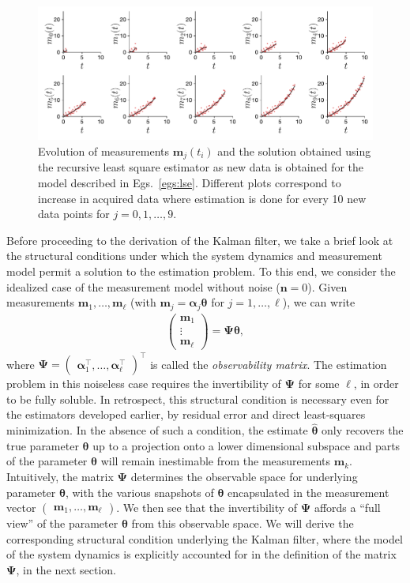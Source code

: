 \documentclass{resonance}
\def\th{\bm{\theta}}
\def\thh{\bm{\hat{\theta}}}
\def\n{\bm{n}}
\def\m{\bm{m}}
\def\H{\bm{\alpha}}
\begin{document}
\begin{figure}
    \centering
    \includegraphics[width=\textwidth]{./figs/rlse.pdf}
    \caption{Evolution of measurements $\m_j(t_i)$ and the solution obtained using the recursive least square estimator as new data is obtained for the model described in Egs.~\ref{egs:lse}. Different plots correspond to increase in acquired data where estimation is done for every 10 new data points for $j = 0, 1, \dots, 9$.}
    \label{fig:rlseFig}
\end{figure}

Before proceeding to the derivation of the Kalman filter,
we take a brief look at the structural conditions under which the system dynamics and measurement model permit a solution to the estimation problem. To this end, we consider the idealized case of the measurement model without noise ($\n = 0$). Given measurements $\m_1, \ldots, \m_\ell$ 
(with $\m_j = \H_j \th$ for $j=1, \ldots, \ell$), we can write
\begin{align*}
    \left( \begin{matrix} \m_1 \\ \vdots \\ \m_{\ell} \end{matrix} \right) 
    = \mathbf{\Psi}  \th,
\end{align*}
where $\mathbf{\Psi} = \left( \begin{matrix} \H_1^\top,  \ldots,  \H_{\ell}^\top \end{matrix} \right)^\top$
is called the \textit{observability matrix}.
The estimation problem in this noiseless case 
requires the invertibility of $\mathbf{\Psi}$
for some $\ell$, in order to be fully soluble. 
In retrospect, this structural condition is necessary even for the estimators developed earlier, by residual error and direct least-squares minimization. In the absence of such a 
condition, the estimate $\thh$ only recovers the true parameter $\th$ up to a projection onto a lower dimensional
subspace and parts of the parameter $\th$ will remain inestimable from the measurements $\m_k$. Intuitively, the matrix $\mathbf{\Psi}$ determines the observable space for underlying parameter $\th$, with the various snapshots of $\th$ encapsulated in the measurement vector $\left( \begin{matrix} \m_1, \ldots, \m_{\ell} \end{matrix} \right)$. We then see that the invertibility of $\mathbf{\Psi}$ affords a ``full view'' of the parameter $\th$ from this observable space.
We will derive the corresponding structural condition 
underlying the Kalman filter, where the model of the system dynamics is explicitly accounted for in the definition of the matrix $\mathbf{\Psi}$, in the next section.
\end{document}
